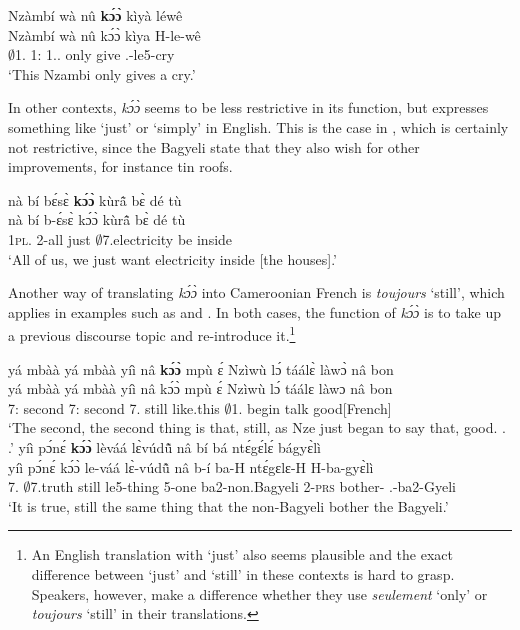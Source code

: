 \ea \label{koo4}
  \glll Nzàmbí wà nû {\bfseries kɔ́ɔ̀} kìyà léwê \\
         Nzàmbí wà nû kɔ́ɔ̀ kìya H-le-wê \\
        $\emptyset$1.{\PN} 1:{\ATT} 1.{\DEM}.{\PROX} only give {\OBJ}.{\LINK}-le5-cry\\
    \trans `This Nzambi only gives a cry.'
\z

In other contexts, {\itshape kɔ́ɔ̀} seems to be less restrictive in its function, but expresses something like `just' or `simply' in English. This is the case in , which is certainly not restrictive, since the Bagyeli state that they also wish for other improvements, for instance tin roofs.

\ea \label{koo5}
  \glll nà bí bɛ́sɛ̀ {\bfseries kɔ́ɔ̀} kùrã̂  bɛ̀ dé tù \\
       nà bí b-ɛ́sɛ̀ kɔ́ɔ̀ kùrã̂  bɛ̀ dé tù \\
        {\COM} 1\textsc{pl}.{\SBJ} 2-all just $\emptyset$7.electricity  be {\LOC} inside\\
    \trans `All of us, we just want electricity  inside [the houses].'
\z

Another way of translating {\itshape kɔ́ɔ̀} into Cameroonian French is {\itshape toujours} `still', which applies in examples such as  and . In both cases, the function of {\itshape kɔ́ɔ̀} is to take up a previous discourse topic and re-introduce it.\footnote{An English translation with `just' also seems plausible and the exact difference between `just' and `still' in these contexts is hard to grasp. Speakers, however, make a difference whether they use {\itshape seulement} `only' or {\itshape toujours} `still' in their translations.}

\ea \label{koo6}
  \glll  yá mbàà yá mbàà yíì nâ {\bfseries kɔ́ɔ̀} mpù ɛ́ Nzìwù lɔ́ táálɛ̀ làwɔ̀ nâ bon\\
         yá mbàà yá mbàà yíì nâ kɔ́ɔ̀ mpù ɛ́ Nzìwù lɔ́ táálɛ làwɔ nâ bon\\
         7:{\ATT} second 7:{\ATT} second 7.{\COP} {\COMP} still like.this {\LOC} $\emptyset$1.{\PN} {\RETRO} begin talk {\COMP} good[French]   \\
    \trans `The second, the second thing is that, still, as Nze just began to say that, good. . .'
\ex\label{koo7}
  \glll yíì pɔ́nɛ́ {\bfseries kɔ́ɔ̀} lèváá lɛ̀vúdũ̂ nâ bí bá ntɛ́gɛ́lɛ́ bágyɛ̀lì \\
       yíì pɔ́nɛ́ kɔ́ɔ̀ le-váá lɛ̀-vúdũ̂ nâ b-í ba-H ntɛ́gɛlɛ-H H-ba-gyɛ̀lì \\
         7.{\COP} $\emptyset$7.truth still le5-thing 5-one {\COMP} ba2-non.Bagyeli 2-\textsc{prs} bother-{\R} {\OBJ}.{\LINK}-ba2-Gyeli\\
    \trans `It is true, still the same thing that the non-Bagyeli bother the Bagyeli.'
\z

